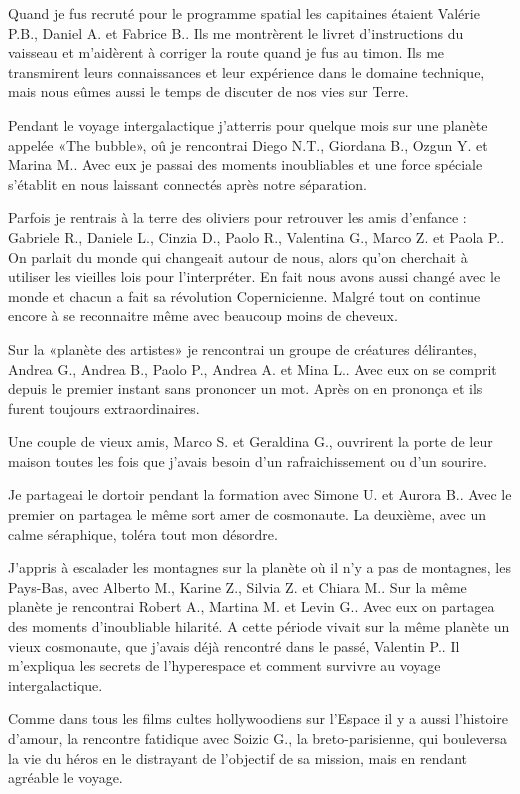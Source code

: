 Quand je fus recrut\'e pour le programme spatial les capitaines \'etaient Val\'erie P.B., Daniel A. et Fabrice B.. Ils me montr\`erent le livret d'instructions du vaisseau et m'aid\`erent \`a corriger la route quand je fus au timon. Ils me transmirent leurs connaissances et leur exp\'erience dans le domaine technique, mais nous e\^umes aussi le temps de discuter de nos vies sur Terre. 

Pendant le voyage intergalactique j'atterris pour quelque mois sur une plan\`ete appel\'ee «The bubble», o\^u je rencontrai Diego N.T., Giordana B., Ozgun Y. et Marina M.. Avec eux je passai des moments inoubliables et une force sp\'eciale s'\'etablit en nous laissant connect\'es apr\`es notre s\'eparation. 

Parfois je rentrais \`a la terre des oliviers pour retrouver les amis d'enfance : Gabriele R., Daniele L., Cinzia D., Paolo R., Valentina G., Marco Z. et Paola P.. On parlait du monde qui changeait autour de nous, alors qu'on cherchait \`a utiliser les vieilles lois pour l'interpr\'eter. En fait nous avons aussi chang\'e avec le monde et chacun a fait sa r\'evolution Copernicienne. Malgr\'e tout on continue encore \`a se reconnaitre m\^eme avec beaucoup moins de cheveux. 
  
Sur la «plan\`ete des artistes» je rencontrai un groupe de cr\'eatures d\'elirantes, Andrea G., Andrea B., Paolo P., Andrea A. et Mina L.. Avec eux on se comprit depuis le premier instant sans prononcer un mot. Apr\`es on en pronon\c{c}a et ils furent toujours extraordinaires.

Une couple de vieux amis, Marco S. et Geraldina G., ouvrirent la porte de leur maison toutes les fois que j'avais besoin d'un rafraichissement ou d'un sourire.

Je partageai le dortoir pendant la formation avec Simone U. et Aurora B.. Avec le premier on partagea le m\^eme sort amer de cosmonaute. La deuxi\`eme, avec un calme s\'eraphique, tol\'era tout mon d\'esordre.   

J’appris \`a escalader les montagnes sur la plan\`ete o\`u il n'y a pas de montagnes, les Pays-Bas, avec Alberto M., Karine Z., Silvia Z. et Chiara M.. Sur la m\^eme plan\`ete je rencontrai Robert A., Martina M. et Levin G.. Avec eux on partagea des moments d'inoubliable hilarit\'e. A cette p\'eriode vivait sur la m\^eme plan\`ete un vieux cosmonaute, que j'avais d\'ej\`a rencontr\'e dans le pass\'e, Valentin P.. Il m'expliqua les secrets de l'hyperespace et comment survivre au voyage intergalactique. 

Comme dans tous les films cultes hollywoodiens sur l'Espace il y a aussi l'histoire d'amour, la rencontre fatidique avec Soizic G., la  breto-parisienne, qui bouleversa la vie du h\'eros en le distrayant de l'objectif de sa mission, mais en rendant agr\'eable le voyage. 

